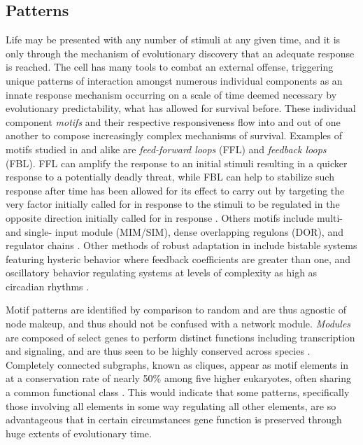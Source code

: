 \subsection{Patterns}
\label{sec:pat}
Life may be presented with any number of stimuli at any given time, and it is only through the mechanism of evolutionary discovery that an adequate response is reached. The cell has many tools to combat an external offense, triggering unique patterns of interaction amongst numerous individual components as an innate response mechanism occurring on a scale of time deemed necessary by evolutionary predictability, \ie what has allowed for survival before. These individual component \emph{motifs} and their respective responsiveness flow into and out of one another to compose increasingly complex mechanisms of survival. Examples of motifs studied in \coli  and \yeast alike are \emph{feed-forward loops} (FFL) and \emph{feedback loops} (FBL).  FFL can amplify the response to an initial stimuli resulting in a quicker response to a potentially deadly threat, while FBL can help to stabilize such response after time has been allowed for its effect to carry out by targeting the very factor initially called for in response to the stimuli to be regulated in the opposite direction initially called for in response \citep{milo2002network,mangan2003structure}. Others motifs include multi- and single- input module (MIM/SIM), dense overlapping regulons (DOR), and regulator chains \citep{kalir2005coherent,lee2002transcriptional,wang2010process}. Other methods of robust adaptation in  \coli include bistable systems featuring hysteric behavior where feedback coefficients are greater than one, and oscillatory behavior regulating systems at levels of complexity as high as circadian rhythms \citep{szallasi2006system}.

Motif patterns are identified by comparison to random and are thus agnostic of node makeup, and thus should not be confused with a network module. \emph{Modules} are composed of select genes \eg to perform distinct functions including transcription and signaling, and are thus seen to be highly conserved across species \citep{alon2007network}. Completely connected subgraphs, known as cliques, appear as motif elements in \yeast at a conservation rate of nearly 50\% among five higher eukaryotes, often sharing a common functional class \citep{wuchty2003evolutionary}. This would indicate that some patterns, specifically those involving all elements in some way regulating all other elements, are so advantageous that in certain circumstances gene function is preserved through huge extents of evolutionary time.

